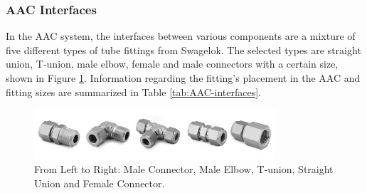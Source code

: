 \documentclass[a4paper,12pt,twoside]{article}
\begin{document}
\subsubsection{AAC Interfaces}
In the AAC system, the interfaces between various components are a mixture of five different types of tube fittings from Swagelok. The selected types are straight union, T-union, male elbow, female and male connectors with a certain  size, shown in Figure \ref{fig:AAC-interfaces-fittings}. Information regarding the fitting's placement in the AAC and fitting sizes are summarized in Table \ref{tab:AAC-interfaces}. 

\begin{figure}[H]
    \centering
    \includegraphics[width=0.8\textwidth]{4-experiment-design/img/Mechanical/AAC-interfaces.jpg}
    \caption{From Left to Right: Male Connector, Male Elbow, T-union, Straight Union and Female Connector.}
    \label{fig:AAC-interfaces-fittings}
\end{figure}
\end{document}
